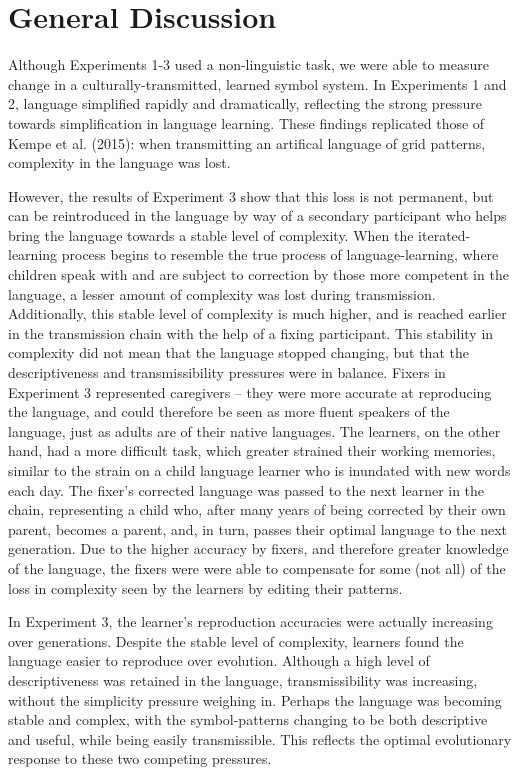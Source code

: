 \documentclass[10pt, letterpaper]{article}
\begin{document}
\section{General Discussion}\label{general-discussion}

Although Experiments 1-3 used a non-linguistic task, we were able to
measure change in a culturally-transmitted, learned symbol system. In
Experiments 1 and 2, language simplified rapidly and dramatically,
reflecting the strong pressure towards simplification in language
learning. These findings replicated those of Kempe et al. (2015): when
transmitting an artifical language of grid patterns, complexity in the
language was lost.

However, the results of Experiment 3 show that this loss is not
permanent, but can be reintroduced in the language by way of a secondary
participant who helps bring the language towards a stable level of
complexity. When the iterated-learning process begins to resemble the
true process of language-learning, where children speak with and are
subject to correction by those more competent in the language, a lesser
amount of complexity was lost during transmission. Additionally, this
stable level of complexity is much higher, and is reached earlier in the
transmission chain with the help of a fixing participant. This stability
in complexity did not mean that the language stopped changing, but that
the descriptiveness and transmissibility pressures were in balance.
Fixers in Experiment 3 represented caregivers -- they were more accurate
at reproducing the language, and could therefore be seen as more fluent
speakers of the language, just as adults are of their native languages.
The learners, on the other hand, had a more difficult task, which
greater strained their working memories, similar to the strain on a
child language learner who is inundated with new words each day. The
fixer's corrected language was passed to the next learner in the chain,
representing a child who, after many years of being corrected by their
own parent, becomes a parent, and, in turn, passes their optimal
language to the next generation. Due to the higher accuracy by fixers,
and therefore greater knowledge of the language, the fixers were were
able to compensate for some (not all) of the loss in complexity seen by
the learners by editing their patterns.

In Experiment 3, the learner's reproduction accuracies were actually
increasing over generations. Despite the stable level of complexity,
learners found the language easier to reproduce over evolution. Although
a high level of descriptiveness was retained in the language,
transmissibility was increasing, without the simplicity pressure
weighing in. Perhaps the language was becoming stable and complex, with
the symbol-patterns changing to be both descriptive and useful, while
being easily transmissible. This reflects the optimal evolutionary
response to these two competing pressures.
\end{document}
